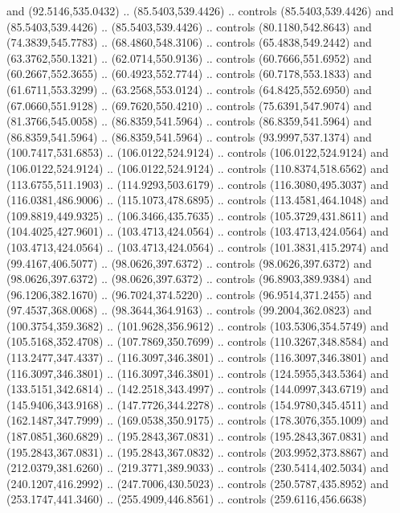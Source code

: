\begin{scope}[shift={(69.41462,-293.94043)}]
    and (92.5146,535.0432) .. (85.5403,539.4426) .. controls (85.5403,539.4426)
    and (85.5403,539.4426) .. (85.5403,539.4426) .. controls (80.1180,542.8643)
    and (74.3839,545.7783) .. (68.4860,548.3106) .. controls (65.4838,549.2442)
    and (63.3762,550.1321) .. (62.0714,550.9136) .. controls (60.7666,551.6952)
    and (60.2667,552.3655) .. (60.4923,552.7744) .. controls (60.7178,553.1833)
    and (61.6711,553.3299) .. (63.2568,553.0124) .. controls (64.8425,552.6950)
    and (67.0660,551.9128) .. (69.7620,550.4210) .. controls (75.6391,547.9074)
    and (81.3766,545.0058) .. (86.8359,541.5964) .. controls (86.8359,541.5964)
    and (86.8359,541.5964) .. (86.8359,541.5964) .. controls (93.9997,537.1374)
    and (100.7417,531.6853) .. (106.0122,524.9124) .. controls (106.0122,524.9124)
    and (106.0122,524.9124) .. (106.0122,524.9124) .. controls (110.8374,518.6562)
    and (113.6755,511.1903) .. (114.9293,503.6179) .. controls (116.3080,495.3037)
    and (116.0381,486.9006) .. (115.1073,478.6895) .. controls (113.4581,464.1048)
    and (109.8819,449.9325) .. (106.3466,435.7635) .. controls (105.3729,431.8611)
    and (104.4025,427.9601) .. (103.4713,424.0564) .. controls (103.4713,424.0564)
    and (103.4713,424.0564) .. (103.4713,424.0564) .. controls (101.3831,415.2974)
    and (99.4167,406.5077) .. (98.0626,397.6372) .. controls (98.0626,397.6372)
    and (98.0626,397.6372) .. (98.0626,397.6372) .. controls (96.8903,389.9384)
    and (96.1206,382.1670) .. (96.7024,374.5220) .. controls (96.9514,371.2455)
    and (97.4537,368.0068) .. (98.3644,364.9163) .. controls (99.2004,362.0823)
    and (100.3754,359.3682) .. (101.9628,356.9612) .. controls (103.5306,354.5749)
    and (105.5168,352.4708) .. (107.7869,350.7699) .. controls (110.3267,348.8584)
    and (113.2477,347.4337) .. (116.3097,346.3801) .. controls (116.3097,346.3801)
    and (116.3097,346.3801) .. (116.3097,346.3801) .. controls (124.5955,343.5364)
    and (133.5151,342.6814) .. (142.2518,343.4997) .. controls (144.0997,343.6719)
    and (145.9406,343.9168) .. (147.7726,344.2278) .. controls (154.9780,345.4511)
    and (162.1487,347.7999) .. (169.0538,350.9175) .. controls (178.3076,355.1009)
    and (187.0851,360.6829) .. (195.2843,367.0831) .. controls (195.2843,367.0831)
    and (195.2843,367.0831) .. (195.2843,367.0832) .. controls (203.9952,373.8867)
    and (212.0379,381.6260) .. (219.3771,389.9033) .. controls (230.5414,402.5034)
    and (240.1207,416.2992) .. (247.7006,430.5023) .. controls (250.5787,435.8952)
    and (253.1747,441.3460) .. (255.4909,446.8561) .. controls (259.6116,456.6638)

\end{scope}
